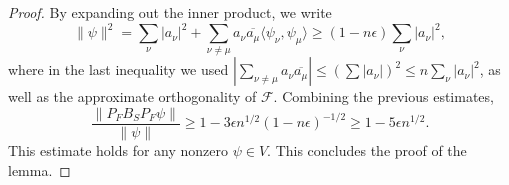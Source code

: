 \documentclass[10pt,a4paper]{amsart}
\newcommand{\cF}{\mathcal F}
\begin{document}
\begin{proof}
By expanding out the inner product, we write
\[
\| \psi \|^2 = \sum_{\nu} |a_\nu|^2  + \sum_{\nu\neq \mu} a_\nu \overline{a_\mu} \langle \psi_\nu, \psi_\mu \rangle \geq (1 - n\epsilon) \sum_\nu |a_\nu|^2,
\]
where in the last inequality we used $\left|\sum_{\nu \neq \mu} a_\nu \overline{a_\mu} \right| \leq (\sum |a_\nu| )^2 \leq n \sum_\nu |a_\nu|^2$, as well as the approximate orthogonality of $\cF$. Combining the previous estimates,
\[
\frac{\| P_F B_S P_F \psi \|}{\| \psi \|}  \geq 1 - 3 \epsilon n^{1/2}(1-n\epsilon)^{-1/2} \geq 1 - 5 \epsilon n^{1/2}.
\]
This estimate holds for any nonzero $\psi \in V$. This concludes the proof of the lemma.
\end{proof}
\end{document}
